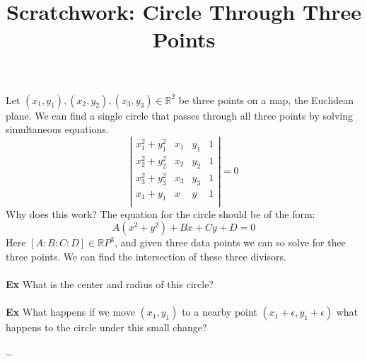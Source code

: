 \documentclass[12pt]{article}
\title{Scratchwork: Circle Through Three Points}
\date{}
\begin{document}
\sffamily

\maketitle

\noindent Let $(x_1, y_1), (x_2, y_2), (x_3, y_3) \in \mathbb{R}^2$ be three points on a map, the Euclidean plane.  We can find a single circle that passes through all three points by solving simultaneous equations.
$$ \left|\begin{array}{cccc} 
x_1^2 + y_1^2 & x_1 & y_1 & 1 \\
x_2^2 + y_2^2 & x_2 & y_2 & 1 \\
x_3^2 + y_3^2 & x_3 & y_3 & 1 \\
x_1   + y_1   & x   & y   & 1 \\
\end{array} \right| = 0 $$
Why does this work?  The equation for the circle should be of the form:
$$ A(x^2 + y^2) + Bx + Cy + D = 0 $$
Here $[A:B:C:D] \in \mathbb{R}P^3$, and given three data points we can so solve for thee three points.  We can find the intersection of these three divisors. \\ \\
\textbf{Ex} What is the center and radius of this circle? \\ \\
\textbf{Ex} What happens if we move $(x_1, y_1)$ to a nearby point $(x_1 + \epsilon, y_1+\epsilon)$ what happens to the circle under this small change?
\vfill
\begin{thebibliography}{} 
\item \dots 
\end{thebibliography}
\end{document}
